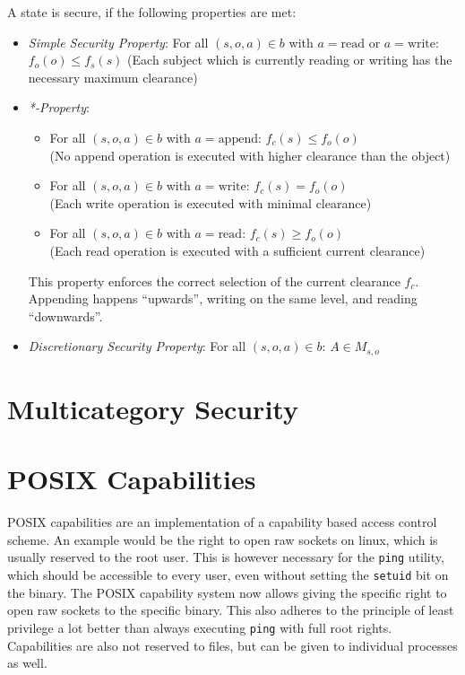 A state is secure, if the following properties are met:
\begin{itemize}
    \item \emph{Simple Security Property}: For all $(s, o, a) \in b$ with
          $a=\text{read}$ or $a=\text{write}$: $f_o(o) \leq f_s(s)$ (Each
          subject which is currently reading or writing has the necessary
          maximum clearance)
    \item \emph{*-Property}:
          \begin{itemize}
              \item For all $(s,o,a)\in b$ with $a=\text{append}$: $f_c(s) \leq
                        f_o(o)$ \\ (No append operation is executed with higher
                        clearance than the object)
              \item For all $(s,o,a)\in b$ with $a=\text{write}$: $f_c(s) =
                        f_o(o)$ \\ (Each write operation is executed with
                        minimal clearance)
              \item For all $(s,o,a)\in b$ with $a=\text{read}$: $f_c(s) \geq
                        f_o(o)$ \\ (Each read operation is executed with a
                        sufficient current clearance)
          \end{itemize}
          This property enforces the correct selection of the current clearance
          $f_c$. Appending happens ``upwards'', writing on the same level, and
          reading ``downwards''.
    \item \emph{Discretionary Security Property}: For all $(s,o,a) \in b$: $A
              \in M_{s,o}$
\end{itemize}

\section{Multicategory Security}

\section{POSIX Capabilities}
POSIX capabilities are an implementation of a capability based access control
scheme. An example would be the right to open raw sockets on linux, which is
usually reserved to the root user. This is however necessary for the
\texttt{ping} utility, which should be accessible to every user, even without
setting the \texttt{setuid} bit on the binary. The POSIX capability system now
allows giving the specific right to open raw sockets to the specific binary.
This also adheres to the principle of least privilege a lot better than always
executing \texttt{ping} with full root rights. Capabilities are also not
reserved to files, but can be given to individual processes as well.
